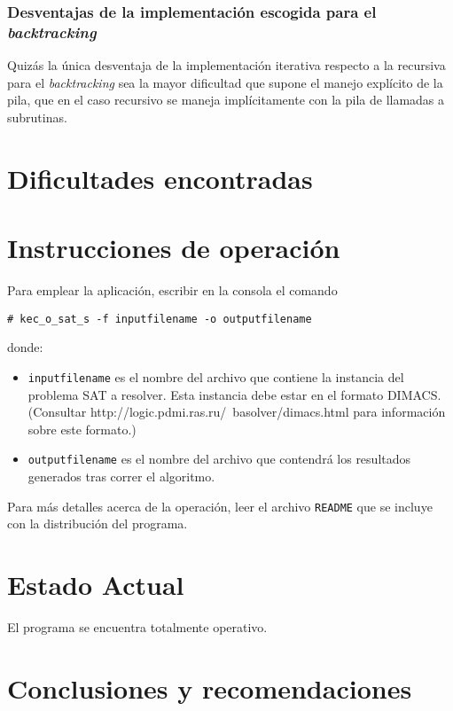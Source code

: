 \documentclass[12pt,lettersize,oneside]{article}
\begin{document}
\subsubsection{Desventajas de la implementación escogida para el \emph{backtracking}}
Quizás la única desventaja de la implementación iterativa respecto a la
recursiva para el \emph{backtracking} sea la mayor dificultad que supone el
manejo explícito de la pila, que en el caso recursivo se maneja implícitamente
con la pila de llamadas a subrutinas.



\section{Dificultades encontradas}

\section{Instrucciones de operación}
Para emplear la aplicación, escribir en la consola el comando
\begin{lstlisting}[style=consola]
# kec_o_sat_s -f inputfilename -o outputfilename 
\end{lstlisting}
\noindent donde:
\vspace{-2.5mm}
\begin{itemize}
\item {\tt inputfilename} es el nombre del archivo que contiene la instancia del
  problema SAT a resolver. Esta instancia debe estar en el formato DIMACS.
(Consultar http://logic.pdmi.ras.ru/~basolver/dimacs.html para información sobre
este formato.)
\item {\tt outputfilename} es el nombre del archivo que contendrá los resultados
  generados tras correr el algoritmo.
\end{itemize}

Para más detalles acerca de la operación, leer el archivo {\tt README} que se
incluye con la distribución del programa.
\section{Estado Actual}
El programa se encuentra totalmente operativo.

\section{Conclusiones y recomendaciones}
\end{document}
